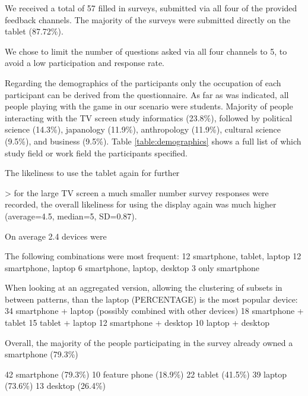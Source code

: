	We received a total of 57 filled in surveys, submitted via all four of the provided feedback channels. The majority of the surveys were submitted directly on the tablet (87.72\%). 


	We chose to limit the number of questions asked via all four channels to 5, to avoid a low participation and response rate. 

	Regarding the demographics of the participants only the occupation of each participant can be derived from the questionnaire. As far as was indicated, all people playing with the game in our scenario were students. Majority of people interacting with the TV screen study informatics (23.8\%), followed by political science (14.3\%), japanology (11.9\%), anthropology (11.9\%), cultural science (9.5\%), and business (9.5\%). Table \ref{table:demographics} shows a full list of which study field or work field the participants specified.

	The likeliness to use the tablet again for further 

		> for the large TV screen a much smaller number survey responses were recorded, the overall likeliness for using the display again was much higher (average=4.5, median=5, SD=0.87).



	On average 2.4 devices were 

	The following combinations were most frequent:
		12	smartphone, tablet, laptop
		12	smartphone, laptop
		6 	smartphone, laptop, desktop
		3 	only smartphone

	When looking at an aggregated version, allowing the clustering of subsets in between patterns, than the laptop (PERCENTAGE) is the most popular device:
		34 	smartphone + laptop (possibly combined with other devices)
		18	smartphone + tablet
		15	tablet + laptop
		12	smartphone + desktop
		10 	laptop + desktop

	Overall, the majority of the people participating in the survey already owned a smartphone (79.3\%)

		42	smartphone (79.3\%)
		10	feature phone (18.9\%)
		22	tablet (41.5\%)
		39	laptop (73.6\%)
		13	desktop (26.4\%)


